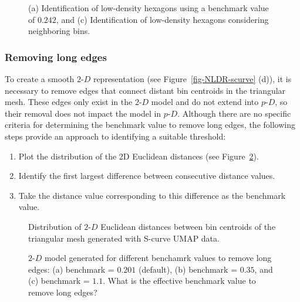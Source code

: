 \documentclass[
  12pt]{article}
\providecommand{\tightlist}{%
  \setlength{\itemsep}{0pt}\setlength{\parskip}{0pt}}\usepackage{longtable,booktabs,array}
\def\tightlist{}
\newcommand\pD{$p\text{-}D$}
\newcommand\gD{$2\text{-}D$}
\begin{document}
\begin{figure}[H]


\caption{\label{fig-lwd-scurve}(a) Identification of low-density
hexagons using a benchmark value of \(0.242\), and (c) Identification of
low-density hexagons considering neighboring bins.}

\end{figure}%

\subsubsection{Removing long edges}\label{removing-long-edges}

To create a smooth \gD{} representation (see
Figure~\ref{fig-NLDR-scurve} (d)), it is necessary to remove edges that
connect distant bin centroids in the triangular mesh. These edges only
exist in the \gD{} model and do not extend into \pD{}, so their removal
does not impact the model in \pD{}. Although there are no specific
criteria for determining the benchmark value to remove long edges, the
following steps provide an approach to identifying a suitable threshold:

\begin{enumerate}
\def\labelenumi{\arabic{enumi}.}
\tightlist
\item
  Plot the distribution of the 2D Euclidean distances (see
  Figure~\ref{fig-dist-scurve}).
\item
  Identify the first largest difference between consecutive distance
  values.
\item
  Take the distance value corresponding to this difference as the
  benchmark value.
\end{enumerate}

\begin{figure}[H]


\caption{\label{fig-dist-scurve}Distribution of \(2\text{-}D\) Euclidean
distances between bin centroids of the triangular mesh generated with
S-curve UMAP data.}

\end{figure}%

\begin{figure}[H]


\caption{\label{fig-lg-scurve}\(2\text{-}D\) model generated for
different benchamrk values to remove long edges: (a) benchmark =
\(0.201\) (default), (b) benchmark = \(0.35\), and (c) benchmark =
\(1.1\). What is the effective benchmark value to remove long edges?}

\end{figure}%
\end{document}

